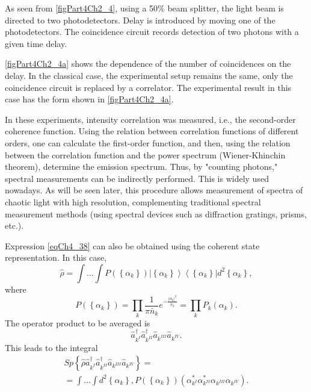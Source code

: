 

As seen from \autoref{figPart4Ch2_4}, using a 50\% beam splitter, the light beam is directed to two photodetectors. Delay is introduced by moving one of the photodetectors. The coincidence circuit records detection of two photons with a given time delay.



\autoref{figPart4Ch2_4a} shows the dependence of the number of coincidences on the delay. In the classical case, the experimental setup remains the same, only the coincidence circuit is replaced by a correlator. The experimental result in this case has the form shown in \autoref{figPart4Ch2_4a}.

In these experiments, intensity correlation was measured, i.e., the second-order coherence function. Using the relation between correlation functions of different orders, one can calculate the first-order function, and then, using the relation between the correlation function and the power spectrum (Wiener-Khinchin theorem), determine the emission spectrum. Thus, by "counting photons," spectral measurements can be indirectly performed. This is widely used nowadays. As will be seen later, this procedure allows measurement of spectra of chaotic light with high resolution, complementing traditional spectral measurement methods (using spectral devices such as diffraction gratings, prisms, etc.). 

Expression \eqref{eqCh4_38} can also be obtained using the coherent state representation. In this case,
\begin{equation}
\hat{\rho} = \int \dots \int P\left(\left\{\alpha_k\right\}\right)
\left|\left\{\alpha_k\right\}\right>\left<\left\{\alpha_k\right\}\right|d^2 \left\{\alpha_k\right\},
\nonumber
\end{equation}
where
\begin{equation}
P\left(\left\{\alpha_k\right\}\right) = \prod_k\frac{1}{\pi
  \bar{n}_k}e^{-\frac{\left|\alpha_k\right|^2}{\bar{n}_k}}=
\prod_k P_k\left(\alpha_k\right).
\nonumber
\end{equation} 
The operator product to be averaged is
\begin{equation}
\hat{a}^{\dag}_{k^{I}}\hat{a}^{\dag}_{k^{II}}\hat{a}_{k^{III}}\hat{a}_{k^{IV}}.
\nonumber
\end{equation}
This leads to the integral
\begin{eqnarray}
Sp \left\{
\hat{\rho}
\hat{a}^{\dag}_{k^{I}}\hat{a}^{\dag}_{k^{II}}\hat{a}_{k^{III}}\hat{a}_{k^{IV}}
\right\} = 
\nonumber \\
= 
\int \dots \int 
d^2 \left\{\alpha_k\right\},
P\left(\left\{\alpha_k\right\}\right)
\left(
\alpha^{*}_{k^{I}}\alpha^{*}_{k^{II}}\alpha_{k^{III}}\alpha_{k^{IV}}
\right).
\nonumber
\end{eqnarray}

